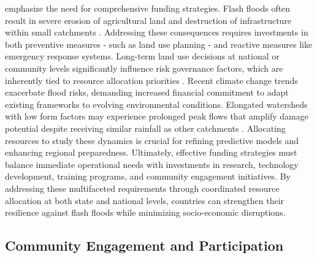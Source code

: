 emphasize the need for comprehensive funding strategies. Flash floods often result in severe erosion of agricultural land and destruction of infrastructure within small catchments \citep{Archer2019}. Addressing these consequences requires investments in both preventive measures - such as land use planning - and reactive measures like emergency response systems. Long-term land use decisions at national or community levels significantly influence risk governance factors, which are inherently tied to resource allocation priorities \citep{Terti2015}. Recent climate change trends exacerbate flood risks, demanding increased financial commitment to adapt existing frameworks to evolving environmental conditions. Elongated watersheds with low form factors may experience prolonged peak flows that amplify damage potential despite receiving similar rainfall as other catchments \citep{Dinis2021}. Allocating resources to study these dynamics is crucial for refining predictive models and enhancing regional preparedness. Ultimately, effective funding strategies must balance immediate operational needs with investments in research, technology development, training programs, and community engagement initiatives. By addressing these multifaceted requirements through coordinated resource allocation at both state and national levels, countries can strengthen their resilience against flash floods while minimizing socio-economic disruptions.

\subsection{Community Engagement and Participation}


